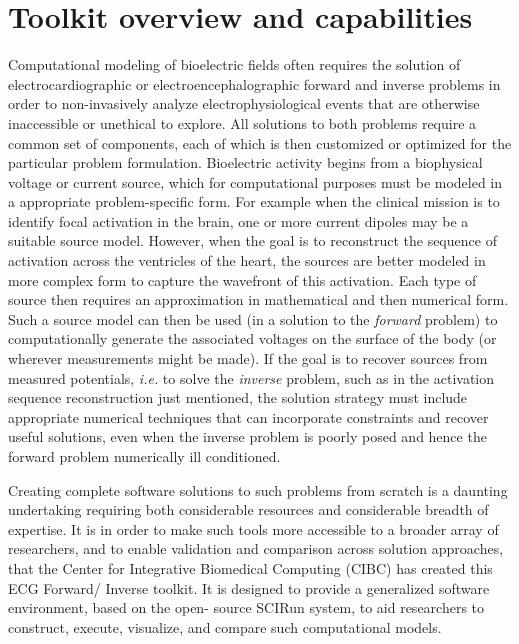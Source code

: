\section{Toolkit overview and capabilities}

Computational modeling of bioelectric fields often requires the solution of
electrocardiographic or electroencephalographic forward and inverse
problems in order to non-invasively analyze electrophysiological events
that are otherwise inaccessible or unethical to explore.  All solutions to
both problems require a common set of components, each of which is then
customized or optimized for the particular problem formulation.
Bioelectric activity begins from a biophysical voltage or current source,
which for computational purposes must be modeled in a appropriate
problem-specific form.  For example when the clinical mission is to
identify focal activation in the brain, one or more current dipoles may be
a suitable source model. However, when the goal is to reconstruct the
sequence of activation across the ventricles of the heart, the sources are
better modeled in more complex form to capture the wavefront of this
activation.  Each type of source then requires an approximation in
mathematical and then numerical form. Such a source model can then be used
(in a solution to the \textit{forward} problem) to computationally generate
the associated voltages on the surface of the body (or wherever
measurements might be made).  If the goal is to recover sources from
measured potentials, \textit{i.e.} to solve the \textit{inverse} problem,
such as in the activation sequence reconstruction just mentioned, the
solution strategy must include appropriate numerical techniques that can
incorporate constraints and recover useful solutions, even when the inverse
problem is poorly posed and hence the forward problem numerically ill
conditioned.

Creating complete software solutions to such problems from scratch is a
daunting undertaking requiring both considerable resources and considerable
breadth of expertise. It is in order to make such tools more accessible to
a broader array of researchers, and to enable validation and comparison
across solution approaches, that the Center for Integrative Biomedical
Computing (CIBC) has created this ECG Forward/ Inverse toolkit. It is
designed to provide a generalized software environment, based on the open-
source SCIRun system, to aid researchers to construct, execute, visualize,
and compare such computational models.  


